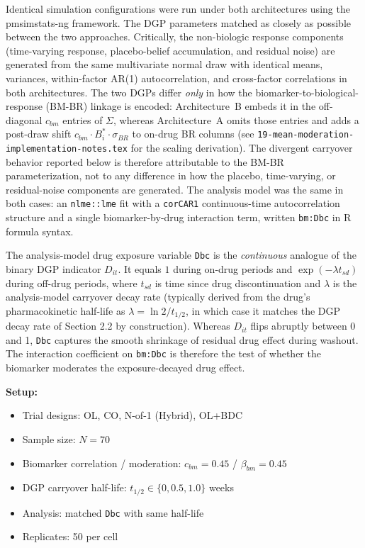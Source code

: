 \documentclass[11pt]{article}
\begin{document}
Identical simulation configurations were run under both
architectures using the pmsimstats-ng framework. The DGP
parameters matched as closely as possible between the two
approaches. Critically, the non-biologic response components
(time-varying response, placebo-belief accumulation, and
residual noise) are generated from the same multivariate normal
draw with identical means, variances, within-factor AR(1)
autocorrelation, and cross-factor correlations in both
architectures. The two DGPs differ \emph{only} in how the
biomarker-to-biological-response (BM-BR) linkage is encoded:
Architecture~B embeds it in the off-diagonal $c_{bm}$ entries of
$\Sigma$, whereas Architecture~A omits those entries and adds a
post-draw shift $c_{bm} \cdot B_i^{*} \cdot \sigma_{BR}$ to
on-drug BR columns (see
\texttt{19-mean-moderation-implementation-notes.tex} for the
scaling derivation). The divergent carryover behavior reported
below is therefore attributable to the BM-BR parameterization,
not to any difference in how the placebo, time-varying, or
residual-noise components are generated. The analysis model was
the same in both cases: an \texttt{nlme::lme} fit with a
\texttt{corCAR1} continuous-time autocorrelation structure and a
single biomarker-by-drug interaction term, written
\texttt{bm:Dbc} in R formula syntax.

The analysis-model drug exposure variable \texttt{Dbc} is the
\emph{continuous} analogue of the binary DGP indicator $D_{it}$.
It equals $1$ during on-drug periods and $\exp(-\lambda t_{sd})$
during off-drug periods, where $t_{sd}$ is time since drug
discontinuation and $\lambda$ is the analysis-model carryover
decay rate (typically derived from the drug's pharmacokinetic
half-life as $\lambda = \ln 2 / t_{1/2}$, in which case it
matches the DGP decay rate of Section 2.2 by construction).
Whereas $D_{it}$ flips abruptly between 0 and 1, \texttt{Dbc}
captures the smooth shrinkage of residual drug effect during
washout. The interaction coefficient on \texttt{bm:Dbc} is
therefore the test of whether the biomarker moderates the
exposure-decayed drug effect.

\textbf{Setup:}

\begin{itemize}
\item Trial designs: OL, CO, N-of-1 (Hybrid), OL+BDC
\item Sample size: $N = 70$
\item Biomarker correlation / moderation: $c_{bm} = 0.45$ /
  $\beta_{bm} = 0.45$
\item DGP carryover half-life: $t_{1/2} \in \{0, 0.5, 1.0\}$ weeks
\item Analysis: matched \texttt{Dbc} with same half-life
\item Replicates: 50 per cell
\end{itemize}
\end{document}
